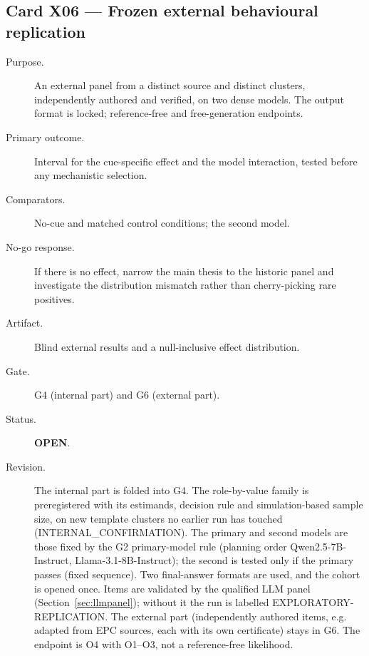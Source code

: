 \documentclass[10pt,a4paper]{article}
\begin{document}
\subsection{Card X06 --- Frozen external behavioural replication}
\label{card:X06}
\begin{description}
\item[Purpose.] An external panel from a distinct source and distinct clusters, independently authored and
verified, on two dense models. The output format is locked; reference-free and free-generation endpoints.
\item[Primary outcome.] Interval for the cue-specific effect and the model interaction, tested before any
mechanistic selection.
\item[Comparators.] No-cue and matched control conditions; the second model.
\item[No-go response.] If there is no effect, narrow the main thesis to the historic panel and investigate the
distribution mismatch rather than cherry-picking rare positives.
\item[Artifact.] Blind external results and a null-inclusive effect distribution.
\item[Gate.] G4 (internal part) and G6 (external part).
\item[Status.] \textbf{OPEN}.
\item[Revision.] The internal part is folded into G4. The role-by-value family is preregistered with its
estimands, decision rule and simulation-based sample size, on new template clusters no earlier run has touched
(INTERNAL\_CONFIRMATION). The primary and second models are those fixed by the G2 primary-model rule (planning
order Qwen2.5-7B-Instruct, Llama-3.1-8B-Instruct); the second is tested only if the primary passes (fixed sequence). Two final-answer formats are used, and the cohort is opened once. Items are validated by the
qualified LLM panel (Section~\ref{sec:llmpanel}); without it the run is labelled EXPLORATORY-REPLICATION. The external part (independently authored items, e.g.
adapted from EPC sources, each with its own certificate) stays in G6. The endpoint is O4 with O1--O3, not a
reference-free likelihood.
\end{description}

\end{document}
